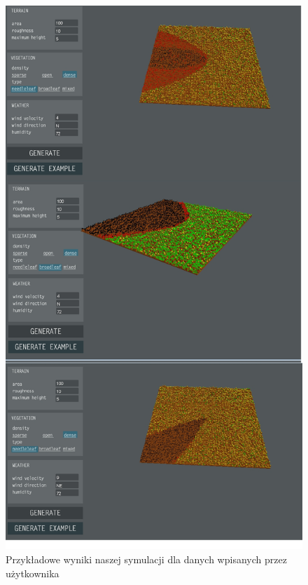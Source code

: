 \documentclass[a4paper, 11pt]{article}
\begin{document}
	\begin{figure}[H]
		\centerline{\includegraphics[scale=0.4]{MJscreen3}}
		\raggedright{	\caption{Przykładowe wyniki naszej symulacji dla danych wpisanych przez użytkownika}}
	\end{figure}\begin{figure}[H]

\end{figure}
\end{document}
